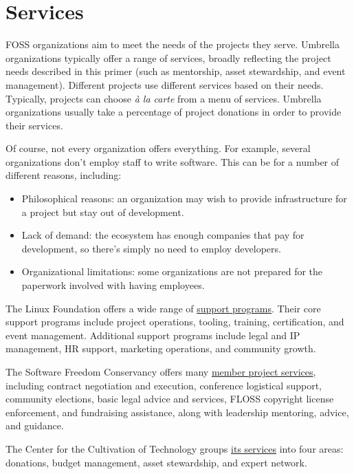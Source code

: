 


\chapter{Services}

FOSS organizations aim to meet the needs of the projects they serve.  Umbrella organizations typically offer a range of services, broadly reflecting the project needs described in this primer (such as mentorship, asset stewardship, and event management).  Different projects use different services based on their needs.  Typically, projects can choose \textit{à la carte} from a menu of services.  Umbrella organizations usually take a percentage of project donations in order to provide their services.

Of course, not every organization offers everything.  For example, several organizations don't employ staff to write software.  This can be for a number of different reasons, including:

\begin{itemize}

\itemsep 0.50em

\item Philosophical reasons: an organization may wish to provide infrastructure for a project but stay out of development.
\item Lack of demand: the ecosystem has enough companies that pay for development, so there's simply no need to employ developers.
\item Organizational limitations: some organizations are not prepared for the paperwork involved with having employees.

\end{itemize}

\begin{kaobox}[frametitle=Example services and support programs]

The Linux Foundation offers a wide range of \href{https://www.linuxfoundation.org/en/projects/support-programs/}{support programs}.  Their core support programs include project operations, tooling, training, certification, and event management.  Additional support programs include legal and IP management, HR support, marketing operations, and community growth.

The Software Freedom Conservancy offers many \href{https://sfconservancy.org/projects/services/}{member project services}, including contract negotiation and execution, conference logistical support, community elections, basic legal advice and services, FLOSS copyright license enforcement, and fundraising assistance, along with leadership mentoring, advice, and guidance.

The Center for the Cultivation of Technology groups \href{https://techcultivation.org/#overview}{its services} into four areas: donations, budget management, asset stewardship, and expert network.

\end{kaobox}

